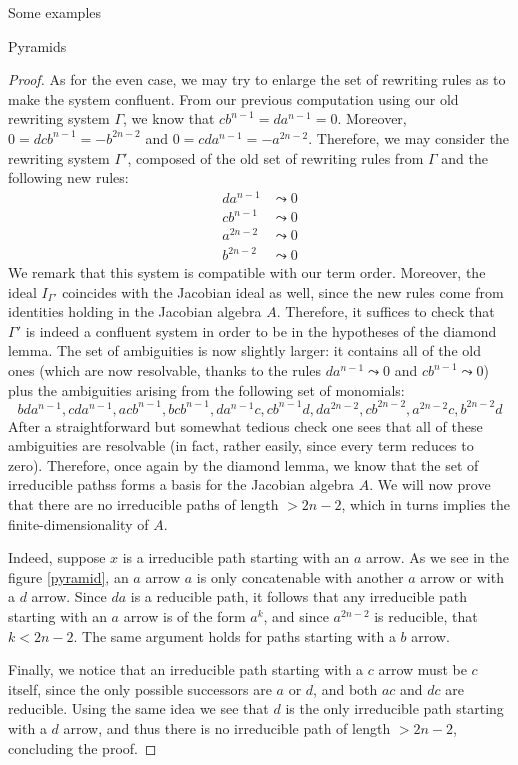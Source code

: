 \begin{chapter}{Some examples}
\begin{section}{Pyramids}
\begin{proof}
As for the even case, we may try to enlarge the set of rewriting rules as to make the system confluent. From our previous computation using our old rewriting system $\Gamma$, we know that $cb^{n-1}=da^{n-1}=0$. Moreover,  $0=dcb^{n-1}=-b^{2n-2}$ and  $0=cda^{n-1}=-a^{2n-2}$. Therefore, we may consider the rewriting system $\Gamma'$, composed of the old set of rewriting rules from $\Gamma$ and the following new rules:
\begin{align*}
da^{n-1} &\leadsto 0 \\
cb^{n-1} &\leadsto 0\\
a^{2n-2} &\leadsto 0\\
b^{2n-2} &\leadsto 0
\end{align*}
We remark that this system is compatible with our term order. Moreover, the ideal $I_{\Gamma'}$ coincides with the Jacobian ideal as well, since the new rules come from identities holding in the Jacobian algebra $A$. Therefore, it suffices to check that $\Gamma'$ is indeed a confluent system in order to be in the hypotheses of the diamond lemma. The set of ambiguities is now slightly larger: it contains all of the old ones (which are now resolvable, thanks to the rules $da^{n-1} \leadsto 0$ and $cb^{n-1} \leadsto 0$) plus the ambiguities arising from the following set of monomials:
\[bda^{n-1}, cda^{n-1}, acb^{n-1}, bcb^{n-1}, da^{n-1}c, cb^{n-1}d, da^{2n-2}, cb^{2n-2}, a^{2n-2}c, b^{2n-2}d\]
After a straightforward but somewhat tedious check one sees that all of these ambiguities are resolvable (in fact, rather easily, since every term reduces to zero). Therefore, once again by the diamond lemma, we know that the set of irreducible pathss forms a basis for the Jacobian algebra $A$. We will now prove that there are no irreducible paths of length $>2n-2$, which in turns implies the finite-dimensionality of $A$.

Indeed, suppose $x$ is a irreducible path starting with an $a$ arrow. As we see in the figure \ref{pyramid}, an $a$ arrow $a$ is only concatenable with another $a$ arrow or with a $d$ arrow. Since $da$ is a reducible path, it follows that any irreducible path starting with an $a$ arrow is of the form $a^k$, and since $a^{2n-2}$ is reducible, that $k<2n-2$. The same argument holds for paths starting with a $b$ arrow.

Finally, we notice that an irreducible path starting with a $c$ arrow must be $c$ itself, since the only possible successors are $a$ or $d$, and both $ac$ and $dc$ are reducible. Using the same idea we see that $d$ is the only irreducible path starting with a $d$ arrow, and thus there is no irreducible path of length $>2n-2$, concluding the proof.
\end{proof}
\end{section}
\end{chapter}